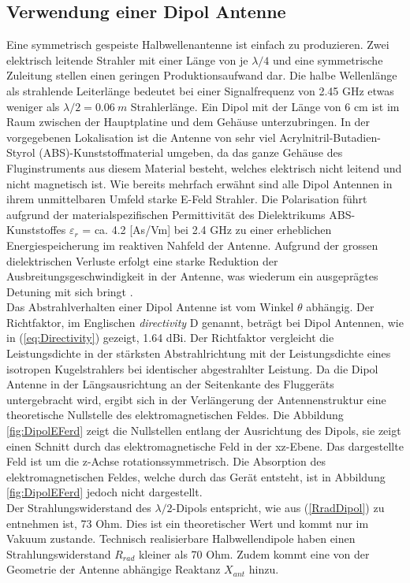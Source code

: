 \subsection{Verwendung einer Dipol Antenne}
Eine symmetrisch gespeiste Halbwellenantenne ist einfach zu produzieren. Zwei elektrisch leitende Strahler mit  einer Länge von je $\lambda/4$ und eine symmetrische Zuleitung stellen einen geringen Produktionsaufwand dar. Die halbe Wellenlänge als strahlende Leiterlänge bedeutet bei einer Signalfrequenz von 2.45 GHz etwas weniger als $\lambda/2=0.06\  m$ Strahlerlänge. Ein Dipol mit der Länge von 6 cm ist im Raum zwischen der Hauptplatine und dem Gehäuse unterzubringen. 
In der vorgegebenen Lokalisation ist die Antenne von sehr viel Acrylnitril-Butadien-Styrol (ABS)-Kunststoffmaterial umgeben, da das ganze Gehäuse des Fluginstruments aus diesem Material besteht, welches elektrisch nicht leitend und nicht magnetisch ist. Wie bereits mehrfach erwähnt sind alle Dipol Antennen in ihrem unmittelbaren Umfeld starke E-Feld Strahler. Die Polarisation führt aufgrund der materialspezifischen Permittivität des Dielektrikums ABS-Kunststoffes $\varepsilon_r$ = ca. 4.2 [As/Vm] bei 2.4 GHz zu einer erheblichen Energiespeicherung im reaktiven Nahfeld der Antenne. Aufgrund der grossen dielektrischen Verluste erfolgt eine starke Reduktion der Ausbreitungsgeschwindigkeit in der Antenne, was wiederum ein ausgeprägtes Detuning mit sich bringt \cite{WikiPermitt}.\\

Das Abstrahlverhalten einer Dipol Antenne ist vom Winkel $\theta$ abhängig. Der Richtfaktor, im Englischen \textit{directivity} D genannt, beträgt bei Dipol Antennen, wie in (\ref{eq:Directivity}) gezeigt, 1.64 dBi. Der Richtfaktor vergleicht die Leistungsdichte in der stärksten Abstrahlrichtung mit der Leistungsdichte eines isotropen Kugelstrahlers bei identischer abgestrahlter Leistung. Da die Dipol Antenne in der Längsausrichtung an der Seitenkante des Fluggeräts untergebracht wird, ergibt sich in der Verlängerung der Antennenstruktur eine theoretische Nullstelle des elektromagnetischen Feldes. Die Abbildung \ref{fig:DipolEFerd} zeigt die Nullstellen entlang der Ausrichtung des Dipols, sie zeigt einen Schnitt durch das elektromagnetische Feld in der xz-Ebene. Das dargestellte Feld ist um die z-Achse rotationssymmetrisch. Die Absorption des elektromagnetischen Feldes, welche durch das Gerät entsteht, ist in Abbildung \ref{fig:DipolEFerd} jedoch nicht dargestellt.\\
Der Strahlungswiderstand des $\lambda/2$-Dipols entspricht, wie aus (\ref{RradDipol}) zu entnehmen ist, 73 Ohm. Dies ist ein theoretischer Wert und kommt nur im Vakuum zustande. Technisch realisierbare Halbwellendipole haben einen Strahlungswiderstand $R_{rad}$ kleiner als 70 Ohm. Zudem kommt eine von der Geometrie der Antenne abhängige Reaktanz $X_{ant}$ hinzu.

